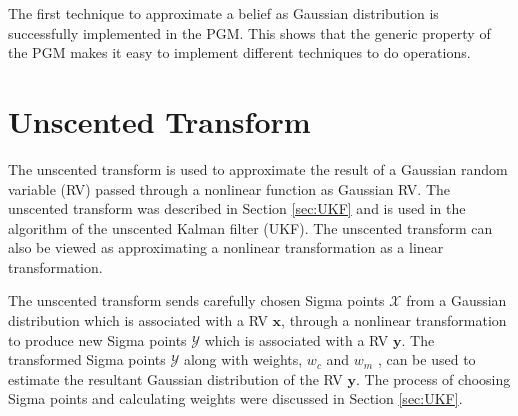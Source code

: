 \documentclass[12pt,oneside,openany,a4paper, %
afrikaans,english,
]{memoir}
\numberwithin{equation}{chapter}
\begin{document}
The first technique to approximate a belief as Gaussian distribution is successfully implemented in the PGM. This shows that the generic property of the PGM makes it easy to implement different techniques to do operations.

\section{Unscented Transform}
The unscented transform is used to approximate the result of a Gaussian random variable (RV) passed through a nonlinear function as Gaussian RV. The unscented transform was described in Section \ref{sec:UKF} and is used in the algorithm of the unscented Kalman filter (UKF). The unscented transform can also be viewed as approximating a nonlinear transformation as a linear transformation.

The unscented transform sends carefully chosen Sigma points $\mathcal{X}$ from a Gaussian distribution which is associated with a RV $\bm{x}$, through a nonlinear transformation to produce new Sigma points $\mathcal{Y}$ which is associated with a RV $\bm{y}$. The transformed Sigma points $\mathcal{Y}$ along with weights, $w_c$ and $w_m$ , can be used to estimate the resultant Gaussian distribution of the RV $\bm{y}$. The process of choosing Sigma points and calculating weights were discussed in Section \ref{sec:UKF}.
\end{document}
